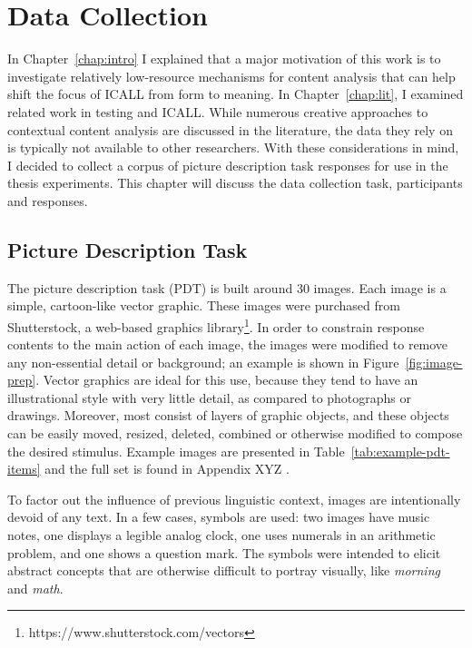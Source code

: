 \chapter{Data Collection}
\label{chap:data}

In Chapter~\ref{chap:intro} I explained that a major motivation of this work is to investigate relatively low-resource mechanisms for content analysis that can help shift the focus of ICALL from form to meaning. In Chapter~\ref{chap:lit}, I examined related work in testing and ICALL. While numerous creative approaches to contextual content analysis are discussed in the literature, the data they rely on is typically not available to other researchers. With these considerations in mind, I decided to collect a corpus of picture description task responses for use in the thesis experiments. This chapter will discuss the data collection task, participants and responses.

\section{Picture Description Task}
\label{sec:pdt}


The picture description task (PDT) is built around 30 images. Each image is a simple, cartoon-like vector graphic. These images were purchased from Shutterstock, a web-based graphics library\footnote{https://www.shutterstock.com/vectors}. In order to constrain response contents to the main action of each image, the images were modified to remove any non-essential detail or background; an example is shown in Figure~\ref{fig:image-prep}. Vector graphics are ideal for this use, because they tend to have an illustrational style with very little detail, as compared to photographs or drawings. Moreover, most consist of layers of graphic objects, and these objects can be easily moved, resized, deleted, combined or otherwise modified to compose the desired stimulus. Example images are presented in Table~\ref{tab:example-pdt-items} and the full set is found in Appendix XYZ .

To factor out the influence of previous linguistic context, images are intentionally devoid of any text. In a few cases, symbols are used: two images have music notes, one displays a legible analog clock, one uses numerals in an arithmetic problem, and one shows a question mark. The symbols were intended to elicit abstract concepts that are otherwise difficult to portray visually, like \textit{morning} and \textit{math}. 


